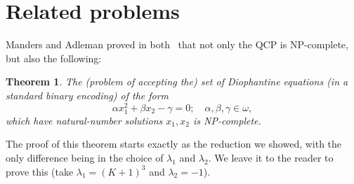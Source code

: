 \documentclass{amsart}
\theoremstyle{plain}
\newtheorem{theorem}{Theorem}
\begin{document}
\section{Related problems}

Manders and Adleman proved in both~\cite{qcp1,qcp2} that not only the QCP is NP-complete, but also
the following:

\begin{theorem}\label{diophantine-thm}
  The (problem of accepting the) set of Diophantine equations (in a standard binary encoding) of
  the form
  \begin{equation*}
    \alpha x_1^2+\beta x_2-\gamma=0;\quad\alpha,\beta,\gamma\in\omega,
  \end{equation*}
  which have natural-number solutions $x_1,x_2$ is NP-complete.
\end{theorem}

The proof of this theorem starts exactly as the reduction we showed, with the only difference being
in the choice of $\lambda_1$ and $\lambda_2$. We leave it to the reader to prove this (take
$\lambda_1={(K+1)}^3$ and $\lambda_2=-1$).


\printbibliography[]
\end{document}

